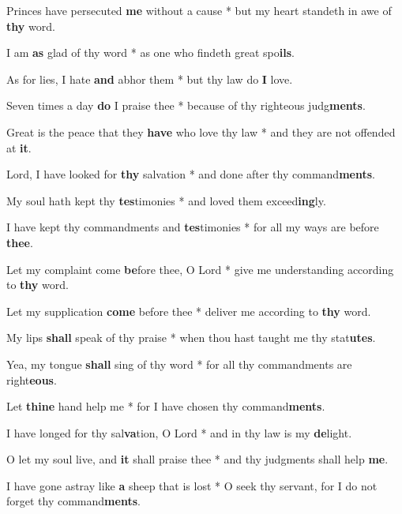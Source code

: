 \begin{multicols}{2}
	Princes have persecuted \textbf{me} without a cause * but my heart standeth in awe of \textbf{thy} word.
	
	I am \textbf{as} glad of thy word * as one who findeth great spo\textbf{ils}.
	
	As for lies, I hate \textbf{and} abhor them * but thy law do \textbf{I} love.
	
	Seven times a day \textbf{do} I praise thee * because of thy righteous judg\textbf{ments}.
	
	Great is the peace that they \textbf{have} who love thy law * and they are not offended at \textbf{it}.
	
	Lord, I have looked for \textbf{thy} salvation * and done after thy command\textbf{ments}.
	
	My soul hath kept thy \textbf{tes}timonies * and loved them exceed\textbf{ing}ly.
	
	I have kept thy commandments and \textbf{tes}timonies * for all my ways are before \textbf{thee}.
	
	Let my complaint come \textbf{be}fore thee, O Lord * give me understanding according to \textbf{thy} word.
	
	Let my supplication \textbf{come} before thee * deliver me according to \textbf{thy} word.
	
	My lips \textbf{shall} speak of thy praise * when thou hast taught me thy stat\textbf{utes}.
	
	Yea, my tongue \textbf{shall} sing of thy word * for all thy commandments are right\textbf{eous}.
	
	Let \textbf{thine} hand help me * for I have chosen thy command\textbf{ments}.
	
	I have longed for thy sal\textbf{va}tion, O Lord * and in thy law is my \textbf{de}light.
	
	O let my soul live, and \textbf{it} shall praise thee * and thy judgments shall help \textbf{me}.
	
	I have gone astray like \textbf{a} sheep that is lost * O seek thy servant, for I do not forget thy command\textbf{ments}.
\end{multicols}
